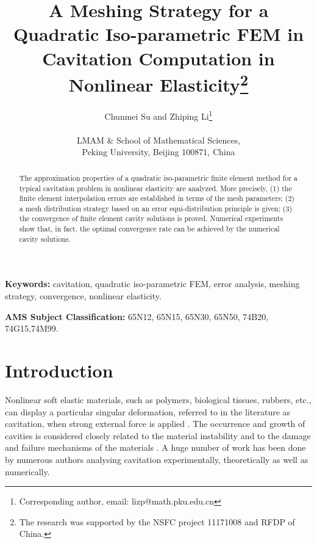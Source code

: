 \documentclass[12pt]{article}
\numberwithin{equation}{section}
\begin{document}
\pagestyle{plain}

\title{ A Meshing Strategy for a Quadratic Iso-parametric
FEM in Cavitation Computation in Nonlinear Elasticity\thanks{The research was
supported by the NSFC
project 11171008 and RFDP of China.}}

\author{Chunmei Su \hspace{1mm} and \hspace{1mm} Zhiping Li\thanks{Corresponding author,
email: lizp@math.pku.edu.cn} \\ \hspace{2mm} \\ LMAM \& School of Mathematical Sciences, \\
Peking University, Beijing 100871, China}

\date{}
\maketitle
\begin{abstract}
The approximation properties of a quadratic iso-parametric
finite element method for a typical cavitation problem in nonlinear elasticity
are analyzed. More precisely, (1) the finite element interpolation errors are
established in terms of the mesh parameters; (2) a mesh distribution strategy based on
an error equi-distribution principle is given; (3) the convergence of finite element
cavity solutions is proved. Numerical experiments show that, in fact, the optimal
convergence rate can be achieved by the numerical cavity solutions.
\end{abstract}

{\small \noindent
\textbf{Keywords:} cavitation, quadratic iso-parametric FEM,
error analysis, meshing strategy, convergence, nonlinear elasticity.

\noindent \textbf{AMS Subject Classification:} 65N12, 65N15, 65N30, 65N50, 74B20,
74G15,74M99.
}


\section{Introduction}
Nonlinear soft elastic materials, such as polymers, biological tissues, rubbers, etc.,
can display a particular singular deformation, referred to in the literature as cavitation,
when strong external force is applied \cite{Cristiano, Dorfmann, Gent and Lindley,
Kundu, Michel}. The occurrence and growth of cavities is considered closely related to the
material instability and to the damage and failure mechanisms of the materials
\cite{Adel,  Xu2015, Xu, Jaravel, Victor}. A huge number of work has been done by
numerous authors analysing cavitation experimentally, theoretically as well as numerically.
\end{document}
